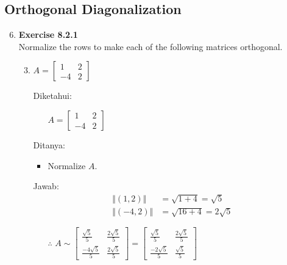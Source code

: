 \documentclass[12pt, a4paper]{scrartcl}
\begin{document}
    \subsection*{Orthogonal Diagonalization}
        \begin{enumerate}
            \setcounter{enumi}{5}
            \item \textbf{Exercise 8.2.1}\\Normalize the rows to make each of the following matrices orthogonal.
            \begin{enumerate}
                \setcounter{enumii}{2}
                \item $A = \begin{bmatrix}
                    1 & 2\\
                    -4 & 2
                \end{bmatrix}$

                Diketahui:
                \begin{itemize}
                    \item[] $A = \begin{bmatrix}
                        1 & 2 \\ -4 & 2
                    \end{bmatrix}$
                \end{itemize}

                Ditanya:
                \begin{itemize}
                    \item Normalize $A$.
                \end{itemize}

                Jawab:
                \begin{align*}
                    \Vert (1, 2) \Vert &= \sqrt{1+4} = \sqrt{5}
                    \\ \Vert (-4, 2) \Vert &= \sqrt{16 + 4} = 2\sqrt{5}
                \end{align*}

                \begin{itemize}
                    \item[$\therefore$] $A \sim \begin{bmatrix}
                        \frac{\sqrt{5}}{5} & \frac{2\sqrt{5}}{5}
                        \\ \frac{-4\sqrt{5}}{5} & \frac{2\sqrt{5}}{5}
                    \end{bmatrix} = \begin{bmatrix}
                        \frac{\sqrt{5}}{5} & \frac{2\sqrt{5}}{5}
                        \\ \frac{-2\sqrt{5}}{5} & \frac{\sqrt{5}}{5}
                    \end{bmatrix}$
                \end{itemize}
            \end{enumerate}
            

\end{enumerate}
\end{document}
